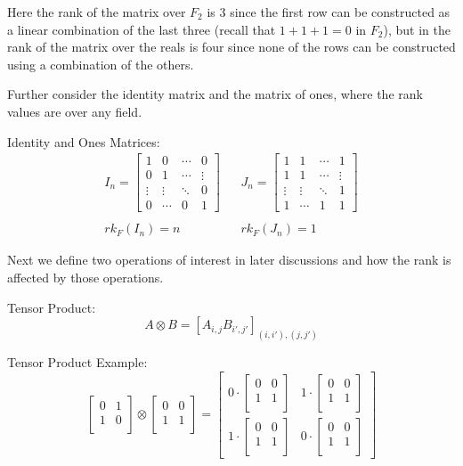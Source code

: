 \documentclass[usletter]{article}
\newcommand{\matrixB}[0]{
    \begin{bmatrix}
      0 & 0 \\
      1 & 1 \\
    \end{bmatrix}
}
\begin{document}
Here the rank of the matrix over $F_2$ is 3 since the first row can be constructed as a linear combination of the last three (recall that $1 + 1 + 1 = 0$ in $F_2$), but in the rank of the matrix over the reals is four since none of the rows can be constructed using a combination of the others.

Further consider the identity matrix and the matrix of ones, where the rank values are over any field.

\begin{example}
Identity and Ones Matrices:
\begin{align*}
  I_n =
  \begin{bmatrix}
  1 & 0 & \cdots & 0 \\
  0 & 1 & \cdots & \vdots \\
  \vdots & \vdots & \ddots & 0 \\
  0 & \cdots & 0 & 1
  \end{bmatrix}
  &&
  J_n =
  \begin{bmatrix}
  1 & 1 & \cdots & 1 \\
  1 & 1 & \cdots & \vdots \\
  \vdots & \vdots & \ddots & 1 \\
  1 & \cdots & 1 & 1
  \end{bmatrix}
  \\
  \\
  rk_{F}(I_n) = n
  &&
  rk_{F}(J_n) = 1
\end{align*}
\end{example}

Next we define two operations of interest in later discussions and how the rank is affected by those operations.

\begin{definition}
  Tensor Product:
  \begin{equation*}
    A \otimes B = [A_{i,j}B_{i',j'}]_{(i, i'),(j,j')}
  \end{equation*}
\end{definition}

\begin{example}
  Tensor Product Example:
  \begin{equation*}
    \begin{bmatrix}
      0 & 1 \\
      1 & 0 \\
    \end{bmatrix}
    \otimes
    \matrixB
    =
    \begin{bmatrix}
      0 \cdot \matrixB & 1 \cdot \matrixB \\
      1 \cdot \matrixB & 0 \cdot \matrixB
    \end{bmatrix}
  \end{equation*}
\end{example}
\end{document}
